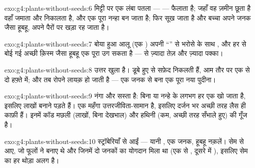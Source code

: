\begin{solution}{exo:g4:plants-without-seeds:6}
 मिट्टी पर एक लंबा पतला  ---  --- फैलाता है; जहाँ वह
ज़मीन छूता है वहाँ  जमाता और  निकालता है, और एक पूरा नन्हा
 बन जाता है; फिर  सूख जाता है और बच्चा अपने जनक जैसा हूबहू,
अपने पैरों पर खड़ा रह जाता है।
\end{solution}

\begin{solution}{exo:g4:plants-without-seeds:7}
बोया हुआ आलू (एक ) अपनी ``'' से भरोसे के साथ ,
और हर  से बोई गई अच्छी क़िस्म जैसा हूबहू एक पूरा  उग सकता है ---
 से ज़्यादा तेज़ और ज़्यादा पक्का।
\end{solution}

\begin{solution}{exo:g4:plants-without-seeds:8}
उत्तर खुला है। डूबे हुए  से सफ़ेद  निकलती हैं, आम तौर पर एक से
दो हफ़्ते में; और तब  रोपने लायक़ हो जाती है --- एक जनक से बना एक
पूरा नया पुदीना।
\end{solution}

\begin{solution}{exo:g4:plants-without-seeds:9}
 नंगा और सस्ता है: बिना  या नन्हे  के लगभग हर एक
खो जाता है, इसलिए लाखों बनाने पड़ते हैं।  एक महँगा
उत्तरजीविता-सामान है, इसलिए दर्जन भर अच्छी तरह लैस  ही काफ़ी हैं।
इनमें कॉड मछली (लाखों, बिना देखभाल) और हथिनी (कम, अच्छी तरह सँभाले
हुए) की गूँज है।
\end{solution}

\begin{solution}{exo:g4:plants-without-seeds:10}
स्ट्रॉबेरियाँ  से आईं --- यानी , एक जनक, हूबहू
नक़लें। सेम  से आए, जो फूलों ने बनाए थे और जिनमें दो जनकों का
योगदान मिला था (एक  से , दूसरे में ), इसलिए सेम का हर
 थोड़ा अलग है।
\end{solution}

